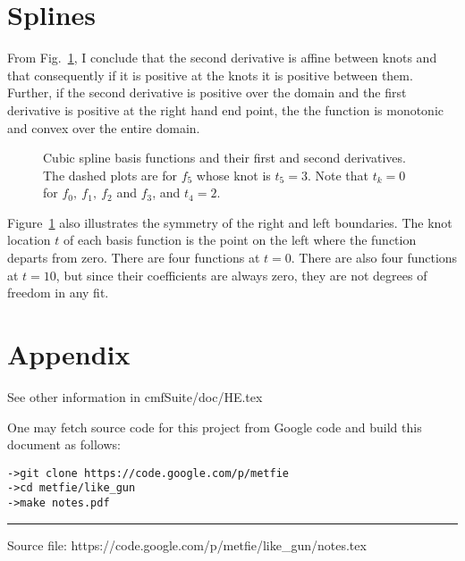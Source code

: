 \documentclass[11pt]{article}
\begin{document}
\section{Splines}
\label{sec:splines}

From Fig.~\ref{fig:basis}, I conclude that the second derivative is
affine between knots and that consequently if it is positive at the
knots it is positive between them.  Further, if the second derivative
is positive over the domain and the first derivative is positive at
the right hand end point, the the function is monotonic and convex
over the entire domain.
\begin{figure}
  \centering
    \caption{Cubic spline basis functions and their first and second
      derivatives. The dashed plots are for $f_5$ whose knot is
      $t_5=3$.  Note that $t_k=0$ for $f_0,~f_1,~f_2$ and $f_3$, and
      $t_4=2$.}
  \label{fig:basis}
\end{figure}

Figure~\ref{fig:basis} also illustrates the symmetry of the right and
left boundaries.  The knot location $t$ of each basis function is the
point on the left where the function departs from zero.  There are
four functions at $t=0$.  There are also four functions at $t=10$, but
since their coefficients are always zero, they are not degrees of
freedom in any fit.

\section*{Appendix}
\label{sec:appendix}

See other information in cmfSuite/doc/HE.tex

One may fetch source code for this project from Google code and build
this document as follows:
\begin{verbatim}
->git clone https://code.google.com/p/metfie
->cd metfie/like_gun
->make notes.pdf
\end{verbatim}

%
\vfill \hrule

Source file: https://code.google.com/p/metfie/like\_gun/notes.tex
\end{document}

